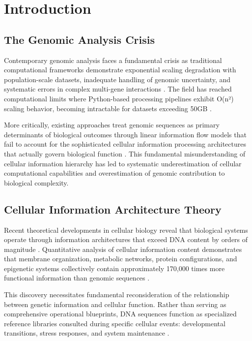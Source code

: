 \documentclass[12pt,a4paper]{article}
\begin{document}
\section{Introduction}

\subsection{The Genomic Analysis Crisis}

Contemporary genomic analysis faces a fundamental crisis as traditional computational frameworks demonstrate exponential scaling degradation with population-scale datasets, inadequate handling of genomic uncertainty, and systematic errors in complex multi-gene interactions \cite{mckenna2010genome, landrum2018clinvar, richards2015standards}. The field has reached computational limits where Python-based processing pipelines exhibit O(n²) scaling behavior, becoming intractable for datasets exceeding 50GB \cite{li2009sequence}.

More critically, existing approaches treat genomic sequences as primary determinants of biological outcomes through linear information flow models that fail to account for the sophisticated cellular information processing architectures that actually govern biological function \cite{alberts2014molecular, lodish2016molecular}. This fundamental misunderstanding of cellular information hierarchy has led to systematic underestimation of cellular computational capabilities and overestimation of genomic contribution to biological complexity.

\subsection{Cellular Information Architecture Theory}

Recent theoretical developments in cellular biology reveal that biological systems operate through information architectures that exceed DNA content by orders of magnitude \cite{shannon1948mathematical, cover2006elements}. Quantitative analysis of cellular information content demonstrates that membrane organization, metabolic networks, protein configurations, and epigenetic systems collectively contain approximately 170,000 times more functional information than genomic sequences \cite{nelson2017lehninger, stryer2015biochemistry}.

This discovery necessitates fundamental reconsideration of the relationship between genetic information and cellular function. Rather than serving as comprehensive operational blueprints, DNA sequences function as specialized reference libraries consulted during specific cellular events: developmental transitions, stress responses, and system maintenance \cite{encode2012integrated, venter2001sequence}.
\end{document}

